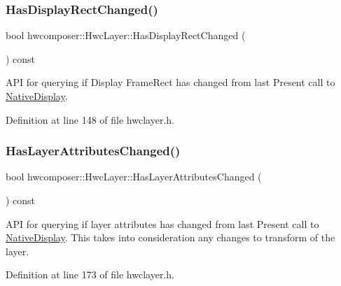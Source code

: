 \subsubsection{\texorpdfstring{Has\+Display\+Rect\+Changed()}{HasDisplayRectChanged()}}
{\footnotesize\ttfamily bool hwcomposer\+::\+Hwc\+Layer\+::\+Has\+Display\+Rect\+Changed (\begin{DoxyParamCaption}{ }\end{DoxyParamCaption}) const\hspace{0.3cm}{\ttfamily [inline]}}

A\+PI for querying if Display Frame\+Rect has changed from last Present call to \mbox{\hyperlink{classhwcomposer_1_1NativeDisplay}{Native\+Display}}. 

Definition at line 148 of file hwclayer.\+h.


\begin{DoxyCode}{0}
\end{DoxyCode}
\mbox{\label{structhwcomposer_1_1HwcLayer_a1721d8448311768aad11378bbc76f659}} 
\subsubsection{\texorpdfstring{Has\+Layer\+Attributes\+Changed()}{HasLayerAttributesChanged()}}
{\footnotesize\ttfamily bool hwcomposer\+::\+Hwc\+Layer\+::\+Has\+Layer\+Attributes\+Changed (\begin{DoxyParamCaption}{ }\end{DoxyParamCaption}) const\hspace{0.3cm}{\ttfamily [inline]}}

A\+PI for querying if layer attributes has changed from last Present call to \mbox{\hyperlink{classhwcomposer_1_1NativeDisplay}{Native\+Display}}. This takes into consideration any changes to transform of the layer. 

Definition at line 173 of file hwclayer.\+h.


\begin{DoxyCode}{0}
\end{DoxyCode}
\mbox{\label{structhwcomposer_1_1HwcLayer_a1cb06b2874c743a6dce634b037a49794}} 
